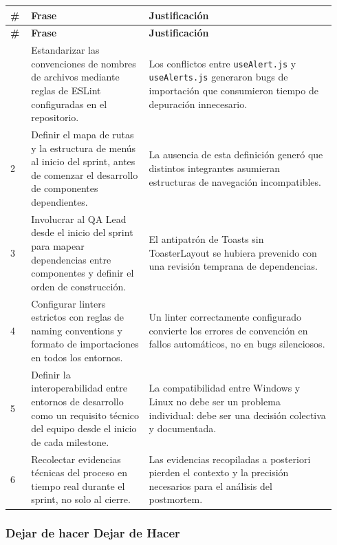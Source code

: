 \documentclass[11pt,a4paper]{article}
\begin{document}
\begingroup
\scriptsize
\setlength{\tabcolsep}{3pt}
\begin{longtable}{P{0.06\linewidth}P{0.34\linewidth}P{0.54\linewidth}}
\toprule
\textbf{\#} & \textbf{Frase} & \textbf{Justificación} \\
\midrule
\endfirsthead
\toprule
\textbf{\#} & \textbf{Frase} & \textbf{Justificación} \\
\midrule
\endhead
\bottomrule
{} & Estandarizar las convenciones de nombres de archivos mediante reglas de ESLint configuradas en el repositorio. & Los conflictos entre \texttt{useAlert.js} y \texttt{useAlerts.js} generaron bugs de importación que consumieron tiempo de depuración innecesario. \\
2 & Definir el mapa de rutas y la estructura de menús al inicio del sprint, antes de comenzar el desarrollo de componentes dependientes. & La ausencia de esta definición generó que distintos integrantes asumieran estructuras de navegación incompatibles. \\
3 & Involucrar al QA Lead desde el inicio del sprint para mapear dependencias entre componentes y definir el orden de construcción. & El antipatrón de Toasts sin ToasterLayout se hubiera prevenido con una revisión temprana de dependencias. \\
4 & Configurar linters estrictos con reglas de naming conventions y formato de importaciones en todos los entornos. & Un linter correctamente configurado convierte los errores de convención en fallos automáticos, no en bugs silenciosos. \\
5 & Definir la interoperabilidad entre entornos de desarrollo como un requisito técnico del equipo desde el inicio de cada milestone. & La compatibilidad entre Windows y Linux no debe ser un problema individual: debe ser una decisión colectiva y documentada. \\
6 & Recolectar evidencias técnicas del proceso en tiempo real durante el sprint, no solo al cierre. & Las evidencias recopiladas a posteriori pierden el contexto y la precisión necesarios para el análisis del postmortem. \\
\end{longtable}
\endgroup

\subsubsection{Dejar de hacer Dejar de Hacer}
\end{document}
